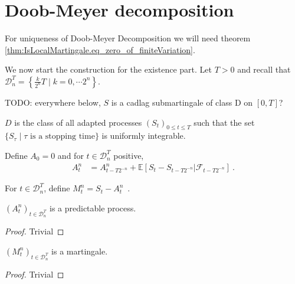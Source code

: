 \section{Doob-Meyer decomposition}



For uniqueness of Doob-Meyer Decomposition we will need theorem \ref{thm:IsLocalMartingale.eq_zero_of_finiteVariation}.

We now start the construction for the existence part.
Let $T>0$ and recall that $\mathcal{D}_n^T=\left\lbrace \frac{k}{2^n}T \mid k=0,\cdots 2^n\right\rbrace$.

TODO: everywhere below, $S$ is a cadlag submartingale of class D on $[0,T]$?


\begin{definition}\label{def:Doob_Meyer_class}
$D$ is the class of all adapted processes $(S_t)_{0\leq t\leq T}$ such that the set $\{S_\tau \mid \tau \text{ is a stopping time}\}$ is uniformly integrable.
\end{definition}


\begin{definition}[A]\label{def:A}
Define $A_0=0$ and for $t\in\mathcal{D}_n^T$ positive,
\begin{align*}
A^n_t
&=A^n_{t-T2^{-n}} + \mathbb{E}\left[ S_t-S_{t-T2^{-n}}|\mathcal{F}_{t-T2^{-n}}\right]
\: .
\end{align*}
\end{definition}


\begin{definition}[M]\label{def:M}
For $t\in\mathcal{D}_n^T$, define $M^n_t = S_t-A^n_t$~.
\end{definition}


\begin{lemma}\label{lem:Doob_Meyer_Finite_Predictable}
  $(A^n_t)_{t\in\mathcal{D}_n^T}$ is a predictable process.
\end{lemma}

\begin{proof}
  Trivial
\end{proof}


\begin{lemma}\label{lem:Doob_Meyer_Finite_Martingale}
  $(M^n_t)_{t\in\mathcal{D}_n^T}$ is a martingale.
\end{lemma}

\begin{proof}
  Trivial
\end{proof}


